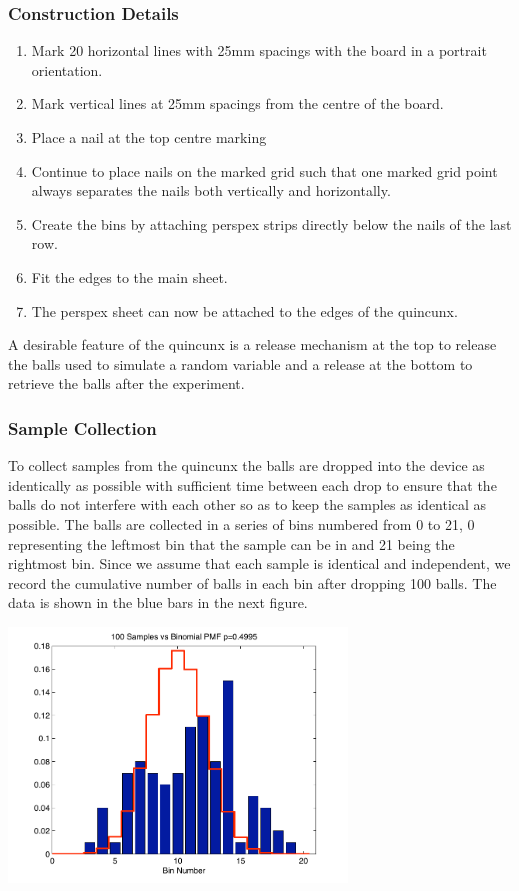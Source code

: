 \subsubsection*{Construction Details}
\begin{enumerate}
    \item Mark 20 horizontal lines with 25mm spacings with the board in a portrait orientation.
\item Mark vertical lines at 25mm spacings from the centre of the board.
\item Place a nail at the top centre marking
\item Continue to place nails on the marked grid such that one marked grid point always separates the nails both vertically and horizontally.
\item Create the bins by attaching perspex strips directly below the nails of the last row.
\item Fit the edges to the main sheet. 
\item The perspex sheet can now be attached to the edges of the quincunx.
\end{enumerate}
 A desirable feature of the quincunx is a release mechanism at the top to release the balls used to simulate a random variable and a release at the bottom to retrieve the balls after the experiment.

\subsubsection*{Sample Collection}
To collect samples from the quincunx the balls are dropped into the device as identically as possible with sufficient time between each drop to ensure that the balls do not interfere with each other so as to keep the samples as identical as possible. The balls are collected in a series of bins numbered from 0 to 21, 0 representing the leftmost bin that the sample can be in and 21 being the rightmost bin. Since we assume that each sample is identical and independent, we record the cumulative number of balls in each bin after dropping 100 balls.
The data is shown in the blue bars in the next figure.

\begin{center}
\includegraphics[width=9cm]{figures/AshmanLawrenceQuincunxData.pdf}
\end{center}

